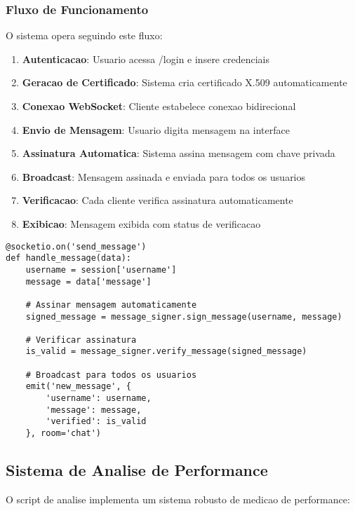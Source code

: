 \documentclass[12pt,a4paper,oneside]{article}
\begin{document}
\subsubsection{Fluxo de Funcionamento}

O sistema opera seguindo este fluxo:

\begin{enumerate}
    \item \textbf{Autenticacao}: Usuario acessa /login e insere credenciais
    \item \textbf{Geracao de Certificado}: Sistema cria certificado X.509 automaticamente
    \item \textbf{Conexao WebSocket}: Cliente estabelece conexao bidirecional
    \item \textbf{Envio de Mensagem}: Usuario digita mensagem na interface
    \item \textbf{Assinatura Automatica}: Sistema assina mensagem com chave privada
    \item \textbf{Broadcast}: Mensagem assinada e enviada para todos os usuarios
    \item \textbf{Verificacao}: Cada cliente verifica assinatura automaticamente
    \item \textbf{Exibicao}: Mensagem exibida com status de verificacao
\end{enumerate}

\begin{lstlisting}[caption=Processamento de mensagem no chat]
@socketio.on('send_message')
def handle_message(data):
    username = session['username']
    message = data['message']
    
    # Assinar mensagem automaticamente
    signed_message = message_signer.sign_message(username, message)
    
    # Verificar assinatura
    is_valid = message_signer.verify_message(signed_message)
    
    # Broadcast para todos os usuarios
    emit('new_message', {
        'username': username,
        'message': message,
        'verified': is_valid
    }, room='chat')
\end{lstlisting}

\subsection{Sistema de Analise de Performance}

O script de analise implementa um sistema robusto de medicao de performance:
\end{document}
